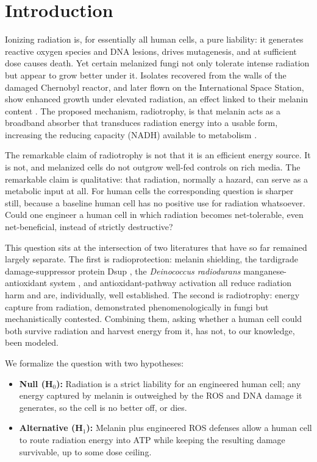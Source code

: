 \documentclass[11pt]{article}
\begin{document}
\section{Introduction}

Ionizing radiation is, for essentially all human cells, a pure liability: it
generates reactive oxygen species and DNA lesions, drives mutagenesis, and at
sufficient dose causes death. Yet certain melanized fungi not only tolerate
intense radiation but appear to grow better under it. Isolates recovered from the
walls of the damaged Chernobyl reactor, and later flown on the International Space
Station, show enhanced growth under elevated radiation, an effect linked to their
melanin content \cite{dadachova2007,shunk2022}. The proposed mechanism,
radiotrophy, is that melanin acts as a broadband absorber that transduces
radiation energy into a usable form, increasing the reducing capacity (NADH)
available to metabolism \cite{dadachova2007,turick2011}.

The remarkable claim of radiotrophy is not that it is an efficient energy source.
It is not, and melanized cells do not outgrow well-fed controls on rich media. The
remarkable claim is qualitative: that radiation, normally a hazard, can serve as a
metabolic input at all. For human cells the corresponding question is sharper
still, because a baseline human cell has no positive use for radiation whatsoever.
Could one engineer a human cell in which radiation becomes net-tolerable, even
net-beneficial, instead of strictly destructive?

This question sits at the intersection of two literatures that have so far
remained largely separate. The first is radioprotection: melanin shielding, the
tardigrade damage-suppressor protein Dsup \cite{hashimoto2016,chavez2019}, the
\textit{Deinococcus radiodurans} manganese-antioxidant system \cite{daly2004}, and
antioxidant-pathway activation \cite{lewis2015} all reduce radiation harm and are,
individually, well established. The second is radiotrophy: energy capture from
radiation, demonstrated phenomenologically in fungi but mechanistically contested.
Combining them, asking whether a human cell could both survive radiation and
harvest energy from it, has not, to our knowledge, been modeled.

We formalize the question with two hypotheses:
\begin{itemize}
  \item \textbf{Null (H$_0$):} Radiation is a strict liability for an engineered
  human cell; any energy captured by melanin is outweighed by the ROS and DNA
  damage it generates, so the cell is no better off, or dies.
  \item \textbf{Alternative (H$_1$):} Melanin plus engineered ROS defenses allow a
  human cell to route radiation energy into ATP while keeping the resulting damage
  survivable, up to some dose ceiling.
\end{itemize}
\end{document}
